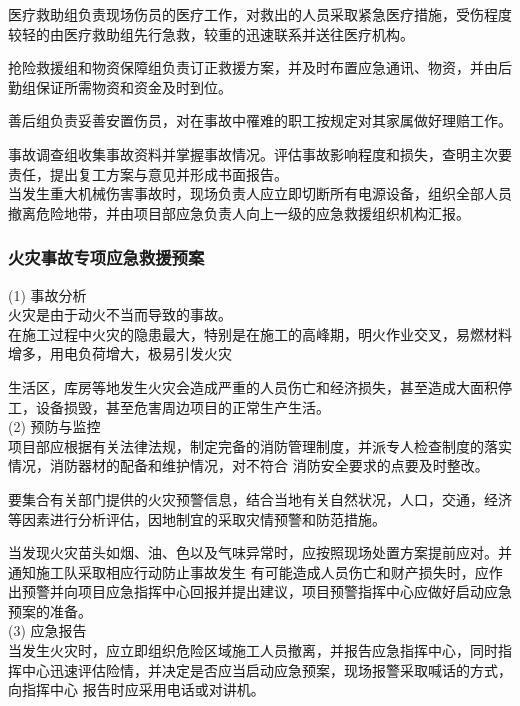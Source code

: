医疗救助组负责现场伤员的医疗工作，对救出的人员采取紧急医疗措施，受伤程度较轻的由医疗救助组先行急救，较重的迅速联系并送往医疗机构。

抢险救援组和物资保障组负责订正救援方案，并及时布置应急通讯、物资，并由后勤组保证所需物资和资金及时到位。

善后组负责妥善安置伤员，对在事故中罹难的职工按规定对其家属做好理赔工作。

事故调查组收集事故资料并掌握事故情况。评估事故影响程度和损失，查明主次要责任，提出复工方案与意见并形成书面报告。\\

当发生重大机械伤害事故时，现场负责人应立即切断所有电源设备，组织全部人员撤离危险地带，并由项目部应急负责人向上一级的应急救援组织机构汇报。

\subsubsection{火灾事故专项应急救援预案}

(1) 事故分析\\

火灾是由于动火不当而导致的事故。\\

在施工过程中火灾的隐患最大，特别是在施工的高峰期，明火作业交叉，易燃材料增多，用电负荷增大，极易引发火灾

生活区，库房等地发生火灾会造成严重的人员伤亡和经济损失，甚至造成大面积停工，设备损毁，甚至危害周边项目的正常生产生活。\\

(2) 预防与监控\\

 项目部应根据有关法律法规，制定完备的消防管理制度，并派专人检查制度的落实情况，消防器材的配备和维护情况，对不符合
消防安全要求的点要及时整改。

 要集合有关部门提供的火灾预警信息，结合当地有关自然状况，人口，交通，经济等因素进行分析评估，因地制宜的采取灾情预警和防范措施。

 当发现火灾苗头如烟、油、色以及气味异常时，应按照现场处置方案提前应对。并通知施工队采取相应行动防止事故发生
有可能造成人员伤亡和财产损失时，应作出预警并向项目应急指挥中心回报并提出建议，项目预警指挥中心应做好启动应急预案的准备。\\

(3) 应急报告\\

当发生火灾时，应立即组织危险区域施工人员撤离，并报告应急指挥中心，同时指挥中心迅速评估险情，并决定是否应当启动应急预案，现场报警采取喊话的方式，向指挥中心
报告时应采用电话或对讲机。


